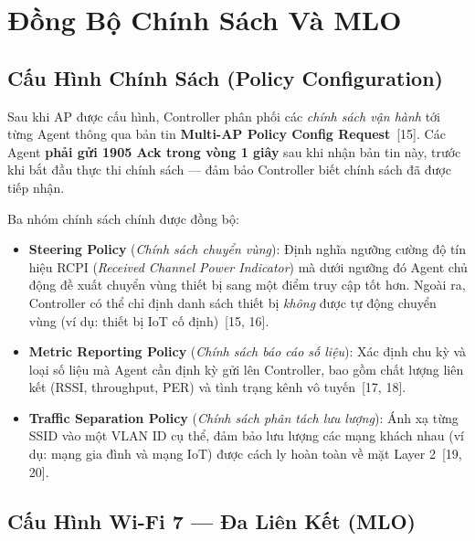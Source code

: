 \section{Đồng Bộ Chính Sách Và MLO}

\subsection{Cấu Hình Chính Sách (Policy Configuration)}

Sau khi AP được cấu hình, Controller phân phối các \textit{chính sách vận hành} tới
từng Agent thông qua bản tin \textbf{Multi-AP Policy Config Request}~[15]. Các Agent
\textbf{phải gửi 1905 Ack trong vòng 1 giây} sau khi nhận bản tin này, trước khi bắt
đầu thực thi chính sách --- đảm bảo Controller biết chính sách đã được tiếp nhận.

Ba nhóm chính sách chính được đồng bộ:
\begin{itemize}
	\item \textbf{Steering Policy} (\textit{Chính sách chuyển vùng}):
	Định nghĩa ngưỡng cường độ tín hiệu RCPI (\textit{Received Channel Power
		Indicator}) mà dưới ngưỡng đó Agent chủ động đề xuất chuyển vùng thiết bị
	sang một điểm truy cập tốt hơn. Ngoài ra, Controller có thể chỉ định danh
	sách thiết bị \textit{không} được tự động chuyển vùng (ví dụ: thiết bị IoT
	cố định)~[15, 16].
	\item \textbf{Metric Reporting Policy} (\textit{Chính sách báo cáo số liệu}):
	Xác định chu kỳ và loại số liệu mà Agent cần định kỳ gửi lên Controller,
	bao gồm chất lượng liên kết (RSSI, throughput, PER) và tình trạng kênh
	vô tuyến~[17, 18].
	\item \textbf{Traffic Separation Policy} (\textit{Chính sách phân tách lưu lượng}):
	Ánh xạ từng SSID vào một VLAN ID cụ thể, đảm bảo lưu lượng các mạng khách
	nhau (ví dụ: mạng gia đình và mạng IoT) được cách ly hoàn toàn về mặt
	Layer 2~[19, 20].
\end{itemize}


\subsection{Cấu Hình Wi-Fi 7 --- Đa Liên Kết (MLO)}

